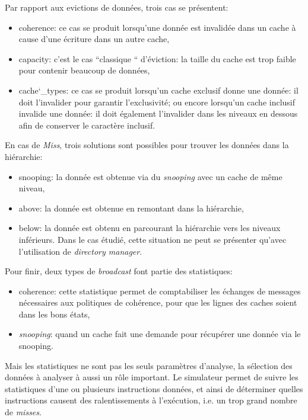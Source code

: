 Par rapport aux evictions de données, trois cas se présentent:
\begin{itemize}
\item coherence: ce cas se produit lorsqu'une donnée est invalidée dans un cache à cause d'une écriture dans un autre cache,
\item capacity: c'est le cas ``classique `` d'éviction: la taille du cache est trop faible pour contenir beaucoup de données,
\item cache\char`_types: ce cas se produit lorsqu'un cache exclusif donne une donnée: il doit l'invalider pour garantir l'exclusivité; ou encore lorsqu'un cache inclusif invalide une donnée: il doit également l'invalider dans les niveaux en dessous afin de conserver le caractère inclusif. \\ 
\end{itemize}

En cas de \emph{Miss}, trois solutions sont possibles pour trouver les données dans la hiérarchie:
\begin{itemize}
\item snooping: la donnée est obtenue via du \emph{snooping} avec un cache de même niveau,
\item above: la donnée est obtenue en remontant dans la hiérarchie,
\item below: la donnée est obtenu en parcourant la hiérarchie vers les niveaux inférieurs. Dans le cas étudié, cette situation ne peut se présenter qu'avec l'utilisation de \emph{directory manager}. \\
\end{itemize}

Pour finir, deux types de \emph{broadcast} font partie des statistiques:
\begin{itemize}
\item coherence: cette statistique permet de comptabiliser les échanges de messages nécessaires aux politiques de cohérence, pour que les lignes des caches soient dans les bons états,
\item \emph{snooping}: quand un cache fait une demande pour récupérer une donnée via le snooping. \\
\end{itemize}


Mais les statistiques ne sont pas les seuls paramètres d'analyse, la sélection des données à analyser à aussi un rôle important. Le simulateur permet de suivre les statistiques d'une ou plusieurs instructions données, et ainsi de déterminer quelles instructions causent des ralentissements à l'exécution, i.e. un trop grand nombre de \emph{misses}.


\newpage

